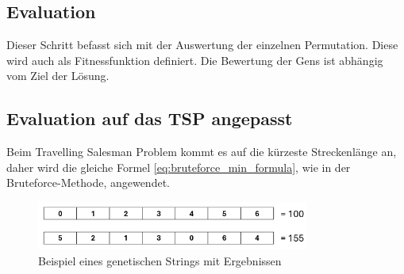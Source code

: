 %
%
%
%
\subsection{Evaluation
\label{buch:paper:varalg:subsection:evaluation}}
Dieser Schritt befasst sich mit der Auswertung der einzelnen 
Permutation. Diese wird auch als Fitnessfunktion definiert.
Die Bewertung der Gens ist abhängig vom Ziel der Lösung.

\subsection{Evaluation auf das TSP angepasst
\label{buch:paper:varalg:subsection:evaluation_tsp}}
Beim Travelling Salesman Problem kommt es auf die kürzeste Streckenlänge an, 
daher wird die gleiche Formel \eqref{eq:bruteforce_min_formula}, wie in der 
Bruteforce-Methode, angewendet.
\begin{figure}
	\centering
	\includegraphics[width=0.8\textwidth]{
        papers/varalg/images/teil3/03GeneticStringCitiesResults.png
        }
	\caption{Beispiel eines genetischen Strings mit Ergebnissen}
	\label{fig:cities_genetic_string_results}
\end{figure}
